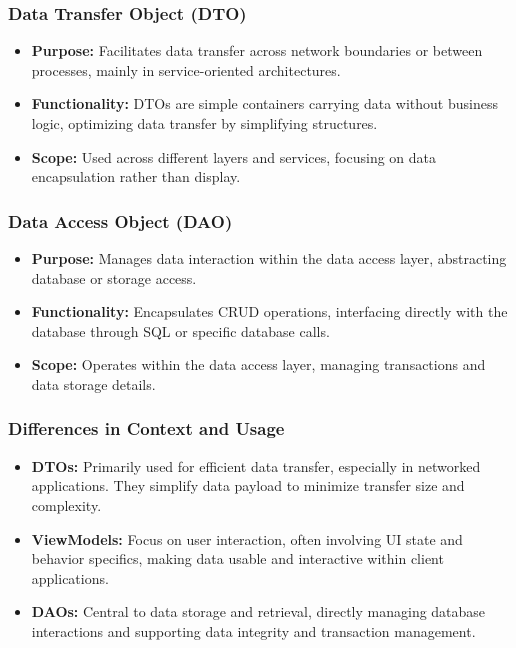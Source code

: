 \subsubsection{Data Transfer Object (DTO)}
\begin{itemize}
    \item \textbf{Purpose:} Facilitates data transfer across network boundaries or between processes, mainly in service-oriented architectures.
    \item \textbf{Functionality:} DTOs are simple containers carrying data without business logic, optimizing data transfer by simplifying structures.
    \item \textbf{Scope:} Used across different layers and services, focusing on data encapsulation rather than display.
\end{itemize}

\subsubsection{Data Access Object (DAO)}
\begin{itemize}
    \item \textbf{Purpose:} Manages data interaction within the data access layer, abstracting database or storage access.
    \item \textbf{Functionality:} Encapsulates CRUD operations, interfacing directly with the database through SQL or specific database calls.
    \item \textbf{Scope:} Operates within the data access layer, managing transactions and data storage details.
\end{itemize}

\subsubsection{Differences in Context and Usage}
\begin{itemize}
    \item \textbf{DTOs:} Primarily used for efficient data transfer, especially in networked applications. They simplify data payload to minimize transfer size and complexity.
    \item \textbf{ViewModels:} Focus on user interaction, often involving UI state and behavior specifics, making data usable and interactive within client applications.
    \item \textbf{DAOs:} Central to data storage and retrieval, directly managing database interactions and supporting data integrity and transaction management.
\end{itemize}

